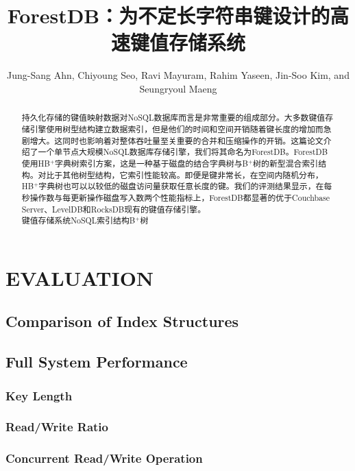 \documentclass[lang=cn]{cls/elegantpaper}
\title{ForestDB：为不定长字符串键设计的高速键值存储系统}
\author{Jung-Sang Ahn, Chiyoung Seo, Ravi Mayuram, Rahim Yaseen, Jin-Soo Kim, and Seungryoul Maeng}
\begin{document}
\maketitle

\begin{abstract}
\noindent \sffamily 持久化存储的键值映射数据对NoSQL数据库而言是非常重要的组成部分。大多数键值存储引擎使用树型结构建立数据索引，但是他们的时间和空间开销随着键长度的增加而急剧增大。这同时也影响着对整体吞吐量至关重要的合并和压缩操作的开销。这篇论文介绍了一个单节点大规模NoSQL数据库存储引擎，我们将其命名为ForestDB。ForestDB使用HB$^+$字典树索引方案，这是一种基于磁盘的结合字典树与B$^+$树的新型混合索引结构。对比于其他树型结构，它索引性能较高。即便是键非常长，在空间内随机分布，HB$^+$字典树也可以以较低的磁盘访问量获取任意长度的键。我们的评测结果显示，在每秒操作数与每更新操作磁盘写入数两个性能指标上，ForestDB都显著的优于Couchbase Server、LevelDB和RocksDB现有的键值存储引擎。\\

\noindent {} 键值存储系统\quad NoSQL\quad 索引结构\quad B$^+$树
\end{abstract}




\section{EVALUATION}

\subsection{Comparison of Index Structures}

\subsection{Full System Performance}

\subsubsection{Key Length}

\subsubsection{Read/Write Ratio}

\subsubsection{Concurrent Read/Write Operation}
\end{document}
